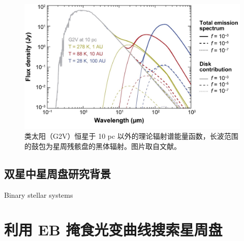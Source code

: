 \begin{figure}[t]
\centering
\includegraphics[width=1.0\textwidth]{figures/chapter3/f4_debrisdisc.jpg}
\caption[类太阳（G2V）恒星于 10 pc 以外的理论辐射谱能量函数，长波范围的鼓包为星周残骸盘的黑体辐射。图片版权归 Wyatt 所有。]{类太阳（G2V）恒星于 10 pc 以外的理论辐射谱能量函数，长波范围的鼓包为星周残骸盘的黑体辐射。图片取自文献。}
\label{fig:debrisdiscsed}
\end{figure}


\subsection{双星中星周盘研究背景} \label{sec:diskintro}

Binary stellar systems



\section{利用 EB 掩食光变曲线搜索星周盘} \label{sec:diskintro}


